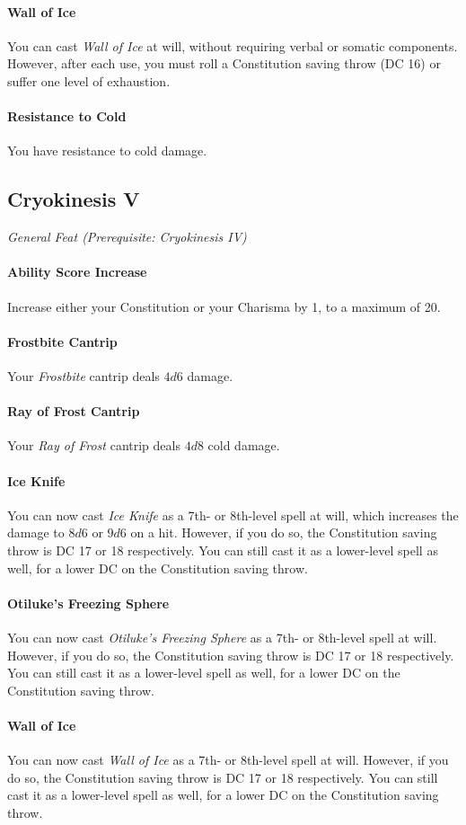\documentclass[twocolumn]{dndbook}
\begin{document}
\paragraph*{Wall of Ice} You can cast \emph{Wall of Ice} at will,
without requiring verbal or somatic components. However, after each use, you must roll a Constitution saving throw (DC 16) or suffer one level of exhaustion.
\paragraph*{Resistance to Cold} You have resistance to cold damage.

\subsection{Cryokinesis V}
{\emph{General Feat (Prerequisite: Cryokinesis IV)}}\par
\paragraph*{Ability Score Increase} Increase either your Constitution or your Charisma by 1, to a maximum of 20.
\paragraph*{Frostbite Cantrip} Your \emph{Frostbite} cantrip deals $ 4d6 $ damage.
\paragraph*{Ray of Frost Cantrip} Your \emph{Ray of Frost} cantrip deals $ 4d8 $ cold damage.
\paragraph*{Ice Knife} You can now cast \emph{Ice Knife} as a 7th- or 8th-level spell at will,
which increases the damage to $ 8d6 $ or $ 9d6 $ on a hit. However, if you do so, the Constitution saving throw is DC 17 or 18 respectively.
You can still cast it as a lower-level spell as well, for a lower DC on the Constitution saving throw.
\paragraph*{Otiluke's Freezing Sphere} You can now cast \emph{Otiluke's Freezing Sphere} as a 7th- or 8th-level spell at will.
However, if you do so, the Constitution saving throw is DC 17 or 18 respectively.
You can still cast it as a lower-level spell as well, for a lower DC on the Constitution saving throw.
\paragraph*{Wall of Ice} You can now cast \emph{Wall of Ice} as a 7th- or 8th-level spell at will.
However, if you do so, the Constitution saving throw is DC 17 or 18 respectively.
You can still cast it as a lower-level spell as well, for a lower DC on the Constitution saving throw.
\end{document}
